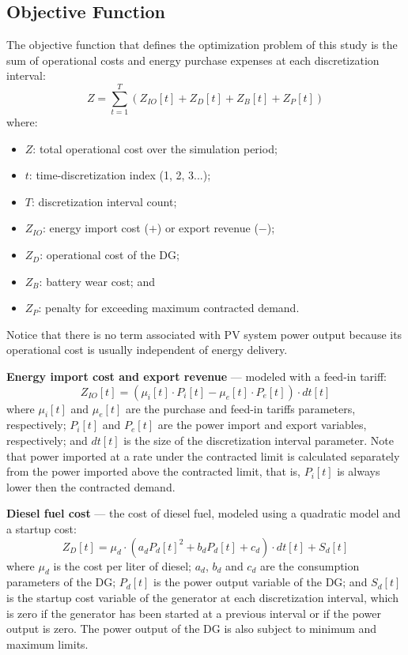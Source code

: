 \documentclass{ieeeaccess}
\begin{document}
    \subsection{Objective Function}
    \label{subsec:obj_func}
    The objective function that defines the optimization problem of this study is the sum of operational costs and energy purchase expenses at each discretization interval:
    \begin{equation}
        Z = \sum_{t=1}^T(Z_{IO}[t] + Z_D[t] + Z_B[t] + Z_P[t])
        \label{eq:z1}
    \end{equation}
    where:
    \begin{itemize}
        \item $Z$: total operational cost over the simulation period;
        \item $t$: time-discretization index (1, 2, 3...);
        \item $T$: discretization interval count;
        \item $Z_{IO}$: energy import cost ($+$) or export revenue ($-$);
        \item $Z_{D}$: operational cost of the \ac{DG};
        \item $Z_{B}$: battery wear cost; and
        \item $Z_{P}$: penalty for exceeding maximum contracted demand.
    \end{itemize}

    Notice that there is no term associated with \ac{PV} system power output because its operational cost is usually independent of energy delivery.

    \textbf{Energy import cost and export revenue} --- modeled with a feed-in tariff:
    \begin{equation}
        Z_{IO}[t] = \left( \mu_i[t] \cdot P_i[t] - \mu_e[t] \cdot P_e[t] \right) \cdot dt[t]
    \end{equation}
    where $\mu_i[t]$ and $\mu_e[t]$ are the purchase and feed-in tariffs parameters, respectively; $P_{i}[t]$ and $P_{e}[t]$ are the power import and export variables, respectively; and $dt[t]$ is the size of the discretization interval parameter. Note that power imported at a rate under the contracted limit is calculated separately from the power imported above the contracted limit, that is, $P_i[t]$ is always lower then the contracted demand.

    \textbf{Diesel fuel cost} --- the cost of diesel fuel, modeled using a quadratic model and a startup cost:
    \begin{equation}
        Z_D[t] = \mu_d \cdot (a^{}_d P_d[t]^{2} + b_dP_d[t] + c_d) \cdot dt[t] + S_d[t]
    \end{equation}
    where $\mu_d$ is the cost per liter of diesel; $a_d$, $b_d$ and $c_d$ are the consumption parameters of the \ac{DG}; $P_d[t]$ is the power output variable of the \ac{DG}; and $S_d[t]$ is the startup cost variable of the generator at each discretization interval, which is zero if the generator has been started at a previous interval or if the power output is zero. The power output of the \ac{DG} is also subject to minimum and maximum limits.
\end{document}
